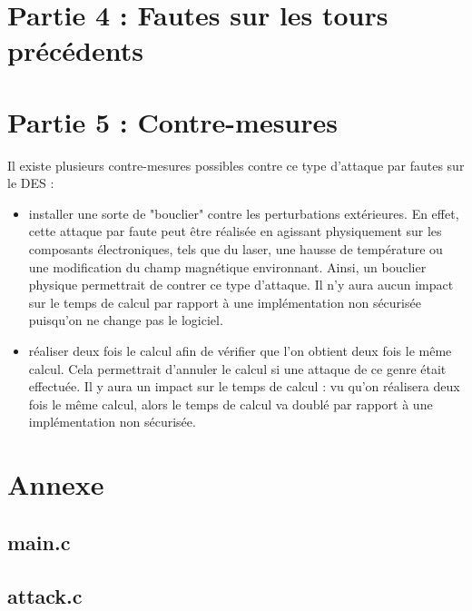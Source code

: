 \documentclass[11pt]{article}
\begin{document}
\section{Partie 4 : Fautes sur les tours précédents}

\section{Partie 5 : Contre-mesures}

Il existe plusieurs contre-mesures possibles contre ce type d'attaque par fautes sur le DES : 
\begin{itemize}
	\item installer une sorte de "bouclier" contre les perturbations extérieures. En effet, cette attaque par faute peut être réalisée en agissant physiquement sur les composants électroniques, tels que du laser, une hausse de température ou une modification du champ magnétique environnant. Ainsi, un bouclier physique permettrait de contrer ce type d'attaque. Il n'y aura aucun impact sur le temps de calcul par rapport à une implémentation non sécurisée puisqu'on ne change pas le logiciel. \newline
	
	\item réaliser deux fois le calcul afin de vérifier que l'on obtient deux fois le même calcul. Cela permettrait d'annuler le calcul si une attaque de ce genre était effectuée. Il y aura un impact sur le temps de calcul : vu qu'on réalisera deux fois le même calcul, alors le temps de calcul va doublé par rapport à une implémentation non sécurisée. 
\end{itemize}

\newpage

\section{Annexe}

\subsection{main.c}

 \newpage

\subsection{attack.c} 

\label{attack.c}
\end{document}

